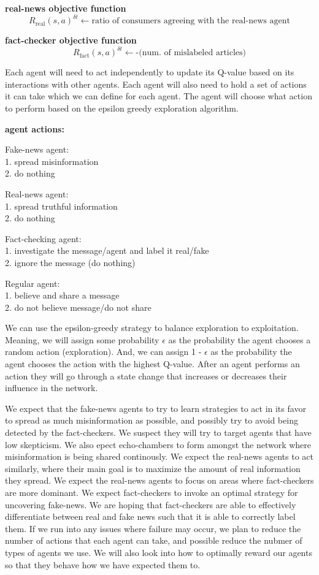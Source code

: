 \documentclass[12pt,twoside]{article}
\begin{document}
\textbf{real-news objective function}
\[R_{\text{real}}(s, a)^{\delta t} \leftarrow \text{ratio of consumers agreeing with the real-news agent}
\]

\textbf{fact-checker objective function}
\[R_{\text{fact}}(s, a)^{\delta t} \leftarrow \text{-(num. of mislabeled articles)}
\]

Each agent will need to act independently to update its Q-value based on its interactions with other agents. Each agent will also need to hold a set of actions it can take which we can define for each agent. The agent will choose what action to perform based on the epsilon greedy exploration algorithm. 

\textbf{agent actions:}

Fake-news agent:\\
1. spread misinformation\\
2. do nothing

Real-news agent:\\
1. spread truthful information\\
2. do nothing

Fact-checking agent:\\
1. investigate the message/agent and label it real/fake\\
2. ignore the message (do nothing)

Regular agent:\\
1. believe and share a message\\
2. do not believe message/do not share

We can use the epsilon-greedy strategy to balance exploration to exploitation. Meaning, we will assign some probability 
$\epsilon$
 as the probability the agent chooses a random action (exploration). And, we can assign 1 - $\epsilon$
 as the probability the agent chooses the action with the highest Q-value. After an agent performs an action they will go through a state change that increases or decreases their influence in the network.

We expect that the fake-news agents to try to learn strategies to act in its favor to spread as much misinformation as possible, and possibly try to avoid being detected by the fact-checkers. We suspect they will try to target agents that have low skepticism. We also epect echo-chambers to form amongst the network where misinformation is being shared continously. We expect the real-news agents to act similarly, where their main goal is to maximize the amount of real information they spread. We expect the real-news agents to focus on areas where fact-checkers are more dominant. We expect fact-checkers to invoke an optimal strategy for uncovering fake-news. We are hoping that fact-checkers are able to effectively differentiate between real and fake news such that it is able to correctly label them. If we run into any issues where failure may occur, we plan to reduce the number of actions that each agent can take, and possible reduce the nubmer of types of agents we use. We will also look into how to optimally reward our agents so that they behave how we have expected them to.
\end{document}
